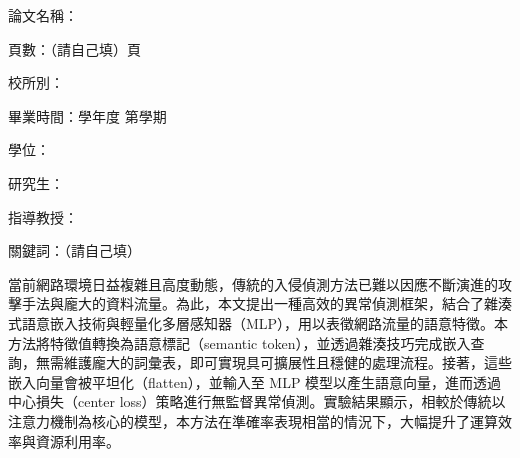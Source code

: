\begin{ZhAbstract}
    \begin{ZhAbstractItems}
        \noindent \text 論文名稱：\cTitle

        \noindent \text 頁數：（請自己填）頁

        \noindent \text 校所別：\univCname \space \deptCname

        \noindent \text 畢業時間：\cAcademicYear 學年度 \space 第\cGraduateSemester 學期

        \noindent \text 學位：\degreeCname

        \noindent \text 研究生：\myCname

        \noindent \text 指導教授：\advisorCname

        \noindent \text 關鍵詞：（請自己填）

    \end{ZhAbstractItems}

    \begin{ZhAbstractDescription}
        當前網路環境日益複雜且高度動態，傳統的入侵偵測方法已難以因應不斷演進的攻擊手法與龐大的資料流量。為此，本文提出一種高效的異常偵測框架，結合了雜湊式語意嵌入技術與輕量化多層感知器（MLP），用以表徵網路流量的語意特徵。本方法將特徵值轉換為語意標記（semantic token），並透過雜湊技巧完成嵌入查詢，無需維護龐大的詞彙表，即可實現具可擴展性且穩健的處理流程。接著，這些嵌入向量會被平坦化（flatten），並輸入至 MLP 模型以產生語意向量，進而透過中心損失（center loss）策略進行無監督異常偵測。實驗結果顯示，相較於傳統以注意力機制為核心的模型，本方法在準確率表現相當的情況下，大幅提升了運算效率與資源利用率。
    \end{ZhAbstractDescription}
    
\end{ZhAbstract}

